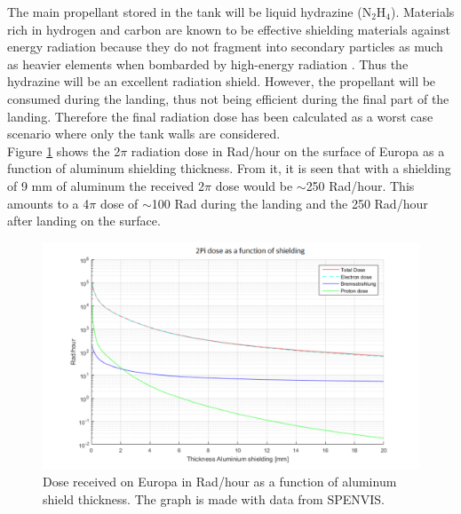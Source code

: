 The main propellant stored in the tank will be liquid hydrazine (N$_2$H$_4$). Materials rich in hydrogen and carbon are known to be effective shielding materials against energy radiation because they do not fragment into secondary particles as much as heavier elements when bombarded by high-energy radiation \cite{rad_shield_2006}. Thus the hydrazine will be an excellent radiation shield. 
However, the propellant will be consumed during the landing, thus not being efficient during the final part of the landing. Therefore the final radiation dose has been calculated as a worst case scenario where only the tank walls are considered. \\

Figure \ref{fig:raddose} shows the 2$\pi$ radiation dose in Rad/hour on the surface of Europa as a function of aluminum shielding thickness. From it, it is seen that with a shielding of 9 mm of aluminum the received 2$\pi$ dose would be $\sim$250 Rad/hour. This amounts to a 4$\pi$ dose of $\sim$100 Rad during the landing and the 250 Rad/hour after landing on the surface.

\begin{figure}[htb]
\begin{center}
\includegraphics[scale=0.5]{figures/navtheory/dose}
\caption{Dose received on Europa in Rad/hour as a function of aluminum shield thickness. The graph is made with data from SPENVIS.}
\label{fig:raddose}
\end{center}
\end{figure}




